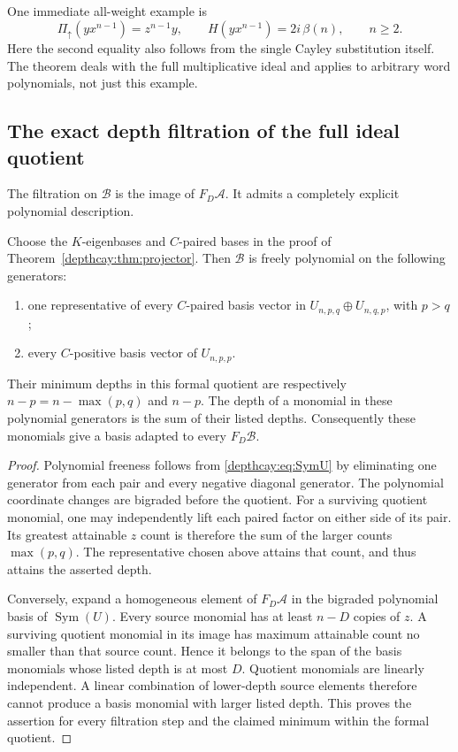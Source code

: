 One immediate all-weight example is
\[
 \Pi_{\uparrow}(yx^{n-1})=z^{n-1}y,\qquad
 H(yx^{n-1})=2i\,\beta(n),\qquad n\ge2.
\]
Here the second equality also follows from the single Cayley substitution
itself. The theorem deals with the full multiplicative ideal and applies
to arbitrary word polynomials, not just this example.

\subsection{The exact depth filtration of the full ideal quotient}

The filtration on $\mathcal B$ is the image of $F_D\mathcal A$.
It admits a completely explicit polynomial description.

\begin{theorem}\label{depthcay:thm:filtered}
Choose the $K$-eigenbases and $C$-paired bases in the proof of
Theorem~\ref{depthcay:thm:projector}. Then $\mathcal B$ is freely
polynomial on the following generators:
\begin{enumerate}
\item one representative of every $C$-paired basis vector in
$U_{n,p,q}\oplus U_{n,q,p}$, with $p>q$;
\item every $C$-positive basis vector of $U_{n,p,p}$.
\end{enumerate}
Their minimum depths in this formal quotient are respectively
$n-p=n-\max(p,q)$ and $n-p$. The depth of a monomial in these
polynomial generators is the sum of their listed depths. Consequently
these monomials give a basis adapted to every $F_D\mathcal B$.
\end{theorem}

\begin{proof}
Polynomial freeness follows from \eqref{depthcay:eq:SymU} by eliminating
one generator from each pair and every negative diagonal generator.
The polynomial coordinate changes are bigraded before the quotient.
For a surviving quotient monomial, one may independently lift each
paired factor on either side of its pair. Its greatest attainable
$z$ count is therefore the sum of the larger counts $\max(p,q)$.
The representative chosen above attains that count, and thus attains
the asserted depth.

Conversely, expand a homogeneous element of $F_D\mathcal A$ in the
bigraded polynomial basis of $\operatorname{Sym}(U)$. Every source
monomial has at least $n-D$ copies of $z$. A surviving quotient
monomial in its image has maximum attainable count no smaller than
that source count. Hence it belongs to the span of the basis monomials
whose listed depth is at most $D$. Quotient monomials are linearly
independent. A linear combination of lower-depth source elements
therefore cannot produce a basis monomial with larger listed depth.
This proves the assertion for every filtration step and the claimed
minimum within the formal quotient.
\end{proof}

